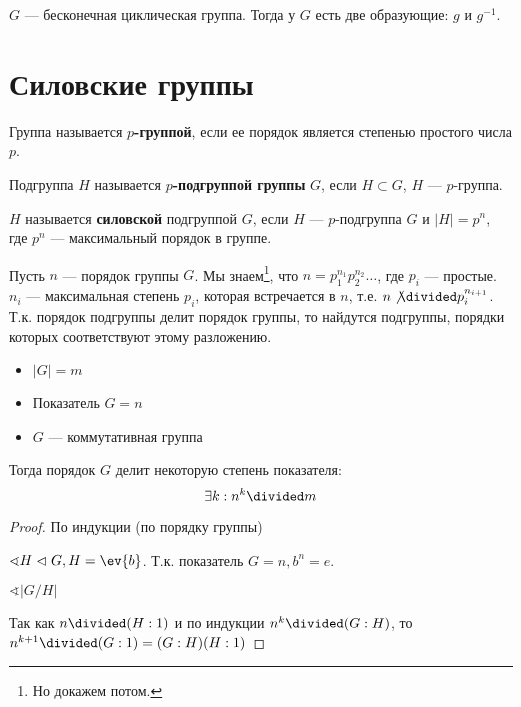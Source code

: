 \begin{lemma}
    \(G\) --- бесконечная циклическая группа. Тогда у \(G\) есть две образующие: \(g\) и \(g^{-1}\).
\end{lemma}

\section{Силовские группы}

\begin{definition}
    Группа называется \textbf{\(p\)-группой}, если ее порядок является степенью простого числа \(p\).
\end{definition}

\begin{definition}
    Подгруппа \(H\) называется \textbf{\(p\)-подгруппой группы} \(G\), если \(H \subset G\), \(H\) --- \(p\)-группа.
\end{definition}

\begin{definition}
    \(H\) называется \textbf{силовской} подгруппой \(G\), если \(H\) --- \(p\)-подгруппа \(G\) и \(|H| = p^n\), где \(p^n\) --- максимальный порядок в группе.
\end{definition}

Пусть \(n\) --- порядок группы \(G\). Мы знаем\footnote{Но докажем потом.}, что \(n = p_1^{n_1} p_2^{n_2} \dots\), где \(p_i\) --- простые. \(n_i\) --- максимальная степень \(p_i\), которая встречается в \(n\), т.е.  \(n \not\divided p_i^{n_{i+1}}\). Т.к. порядок подгруппы делит порядок группы, то найдутся подгруппы, порядки которых соответствуют этому разложению.

\begin{lemma}\itemfix
    \begin{itemize}
        \item \(|G| = m\)
        \item Показатель \(G = n\)
        \item \(G\) --- коммутативная группа
    \end{itemize}
    Тогда порядок \(G\) делит некоторую степень показателя:
    \[\exists k : n^k \divided m\]
\end{lemma}

\begin{proof}
    По индукции (по порядку группы)

    \(\sphericalangle H \vartriangleleft G, H = \ev{b}\). Т.к. показатель \(G = n, b^n = e\).

    \(\sphericalangle |G / H|\)

    Так как \(n \divided (H : 1)\) и по индукции \(n^k \divided (G : H)\), то \(n^{k + 1} \divided (G : 1) = (G : H)(H : 1)\)
\end{proof}

